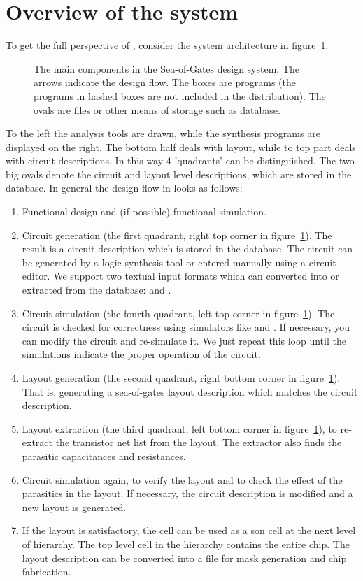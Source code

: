 \section{Overview of the system}
\label{tooloverview}
To get the full perspective of , consider the system architecture in
figure~\ref{oceantools}. 
\begin{figure}
\centerline{}
\caption{The main components in the  Sea-of-Gates
design system. The arrows indicate the design flow. The boxes are
programs (the programs in hashed boxes are not included in the distribution).
The ovals are files or other means of storage such as database.}
\label{oceantools}
\end{figure}
To the left the analysis tools are drawn, while the synthesis programs are
displayed on the right. The bottom half deals with layout, while to top part
deals with circuit descriptions. In this way 4 'quadrants' can be
distinguished. The two big ovals denote the circuit and layout level
descriptions, which are stored in the  database.  In general the
design flow in  looks as follows:
\begin{enumerate}
\item
Functional design and (if possible) functional simulation.
\item
Circuit generation (the first quadrant, right top corner in
figure~\ref{oceantools}). The result is a circuit description which is stored
in the  database. The circuit can be generated by a logic synthesis
tool or entered manually using a circuit editor. We support two textual input
formats which can converted into or extracted from the database:  and
.
\item
Circuit simulation (the fourth quadrant, left top corner in
figure~\ref{oceantools}). The circuit is checked for correctness using
simulators like  and . If necessary, you can modify the
circuit and re-simulate it.  We just repeat this loop until the simulations
indicate the proper operation of the circuit.
\item
\label{whatabout}
Layout generation (the second quadrant, right bottom corner in
figure~\ref{oceantools}). That is, generating a sea-of-gates layout description
which matches the circuit description.
\item
Layout extraction (the third quadrant, left bottom corner in
figure~\ref{oceantools}), to re-extract the transistor net list from the
layout. The extractor also finds the parasitic capacitances and resistances.
\item
Circuit simulation again, to verify the layout and to check the effect of the
parasitics in the layout. If necessary, the circuit description is modified and
a new layout is generated.
\item
If the layout is satisfactory, the cell can be used as a son cell at the next
level of hierarchy. The top level cell in the hierarchy contains the entire
chip. The layout description can be converted into a file for mask generation
and chip fabrication.
\end{enumerate}

